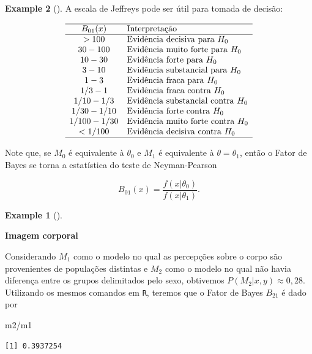 \documentclass[
  letterpaper,
  DIV=11,
  numbers=noendperiod]{scrreprt}
\newenvironment{Shaded}{\begin{snugshade}}{\end{snugshade}}
\newcommand{\NormalTok}[1]{\textcolor[rgb]{0.00,0.23,0.31}{#1}}
\newcommand{\SpecialCharTok}[1]{\textcolor[rgb]{0.37,0.37,0.37}{#1}}
\theoremstyle{definition}
\theoremstyle{plain}
\theoremstyle{definition}
\newtheorem{example}{Example}[chapter]
\theoremstyle{remark}
\begin{document}
\begin{example}[]
A escala de Jeffreys pode ser útil para tomada de decisão:

\[\begin{array}{cl}\hline B_{01}(x) & \text{Interpretação}\\ \hline
>100 & \text{Evidência decisiva para } H_0 \\
30-100 & \text{Evidência muito forte para } H_0 \\
10-30 & \text{Evidência forte para } H_0 \\
3-10 & \text{Evidência substancial para } H_0 \\
1-3 & \text{Evidência fraca para } H_0 \\
1/3-1 & \text{Evidência fraca contra } H_0 \\
1/10-1/3 & \text{Evidência substancial contra } H_0 \\
1/30-1/10 & \text{Evidência forte contra } H_0 \\
1/100-1/30 & \text{Evidência muito forte contra } H_0 \\
<1/100 & \text{Evidência decisiva contra } H_0 \\ \hline
\end{array}\]

Note que, se \(M_0\) é equivalente à \(\theta_0\) e \(M_1\) é
equivalente à \(\theta=\theta_1\), então o Fator de Bayes se torna a
estatística do teste de Neyman-Pearson

\[B_{01}(x)=\frac{f(x|\theta_0)}{f(x|\theta_1)}.\]

\begin{example}[]\protect\hypertarget{exm-}{}\label{exm-}

\textbf{Imagem corporal}

Considerando \(M_1\) como o modelo no qual as percepções sobre o corpo
são provenientes de populações distintas e \(M_2\) como o modelo no qual
não havia diferença entre os grupos delimitados pelo sexo, obtivemos
\(P(M_2|x,y)\approx 0,28\). Utilizando os mesmos comandos em \texttt{R},
teremos que o Fator de Bayes \(B_{21}\) é dado por

\begin{Shaded}
\begin{Highlighting}[]
\NormalTok{m2}\SpecialCharTok{/}\NormalTok{m1}
\end{Highlighting}
\end{Shaded}

\begin{verbatim}
[1] 0.3937254
\end{verbatim}


\end{example}
\end{example}
\end{document}
